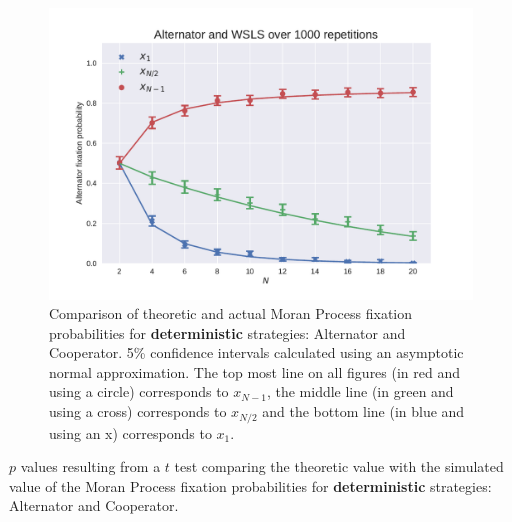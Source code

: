 \documentclass[10pt,journal]{IEEEtran}
\begin{document}
\begin{figure}[!hbtp]
    \centering
    \includegraphics[width=.95\columnwidth]{img/Alternator_v_WSLS.pdf}
    \caption{Comparison of theoretic and actual Moran Process fixation
             probabilities for \textbf{deterministic} strategies: Alternator and
         Cooperator. 5\% confidence intervals calculated using an asymptotic
     normal approximation.
The top most line on all figures (in red and using a circle) corresponds to
\(x_{N-1}\), the middle line (in green and using a cross) corresponds to
\(x_{N/2}\) and the bottom line (in blue and using an x) corresponds to
\(x_{1}\).}
    \label{fig:comparison_deterministic}
\end{figure}

\begin{table}[!hbtp]
    \centering
    
    \caption{\(p\) values resulting from a $t$ test comparing the theoretic
        value with the simulated value of the Moran Process fixation
        probabilities for \textbf{deterministic} strategies: Alternator and
    Cooperator.}
    \label{tab:comparison_deterministic}
\end{table}
\end{document}
